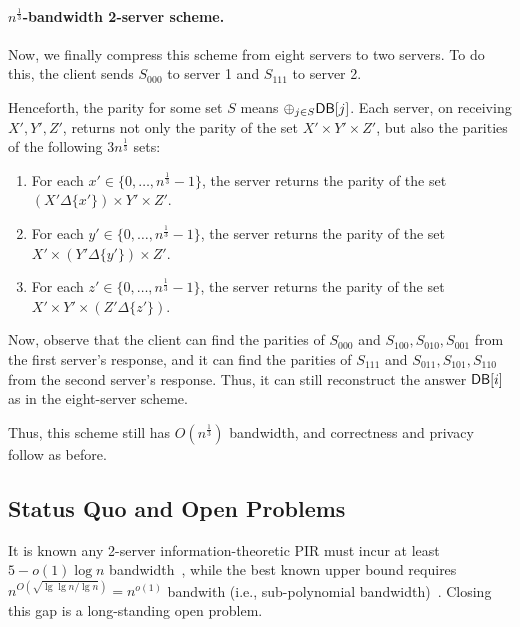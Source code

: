 \paragraph{$n^{\frac13}$-bandwidth 2-server scheme.}
Now, we finally compress this scheme from eight servers to two servers. To do this, the client sends $S_{000}$ to server 1 and $S_{111}$ to server 2.

Henceforth, 
the parity for some set $S$
means $\oplus_{j \in S} {\sf DB}[j]$. 
Each server, on receiving $X', Y', Z'$, 
returns not only the parity of the set 
$X' \times Y' \times Z'$, but also 
the parities of the following 
$3 n^{\frac1 3}$ sets:  
\begin{enumerate}
\item For each $x' \in \{0,\dots,n^{\frac 1 3} - 1\}$, the server
returns 
the parity of the 
set $(X' \Delta \{x'\}) \times Y' \times  Z'$. %
	\item For each $y' \in \{0,\dots,n^{\frac 1 3} - 1\}$, the server 
returns the parity of  
the set $X' \times (Y' \Delta \{y'\}) \times  Z'$.
	\item For each $z' \in \{0,\dots,n^{\frac 1 3} - 1\}$, the server
returns the parity of the set $X' \times Y' \times  (Z' \Delta \{z'\})$.
\end{enumerate}

Now, observe that 
the client can find 
the parities of $S_{000}$ and $S_{100}, S_{010}, S_{001}$
from the first server's response, 
and it can find the parities 
of $S_{111}$ and $S_{011}, S_{101}, S_{110}$
from the second server's response.
Thus, it can still reconstruct the answer ${\sf DB}[i]$
as in the eight-server scheme. 



Thus, this scheme still has $O(n^{\frac 1 3})$ bandwidth, 
and correctness and privacy follow as before.

\subsection{Status Quo and Open Problems}
It is known 
any 2-server information-theoretic PIR must incur
 at least 
$5 - o(1)\log n$ bandwidth~\cite{WdW05},  
while the best known upper bound requires 
	$n^{O\left(\sqrt{\lg \lg n / \lg n}\right)} = n^{o(1)}$ bandwith (i.e., 
sub-polynomial
bandwidth)~\cite{dvir20162}. 
Closing this gap is a long-standing open problem. 


